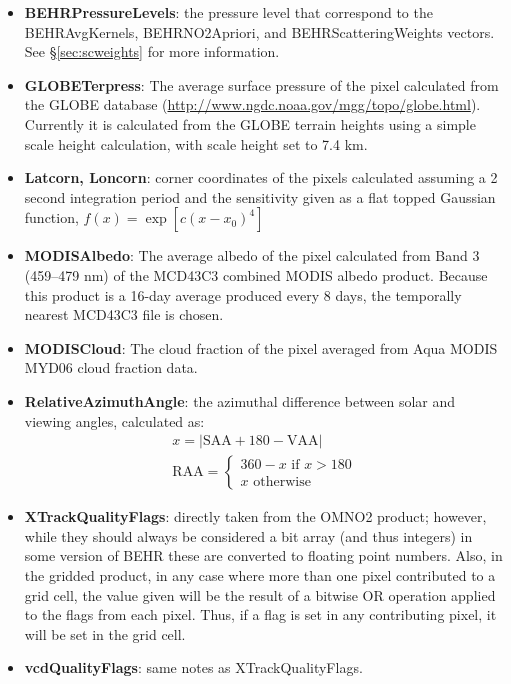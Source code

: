 \documentclass[12pt]{article}
\begin{document}
\begin{itemize}
	\item \textbf{BEHRPressureLevels}: the pressure level that correspond to the BEHRAvgKernels, BEHRNO2Apriori, and BEHRScatteringWeights vectors. See \S\ref{sec:scweights} for more information.
	
	\item \textbf{GLOBETerpress}: The average surface pressure of the pixel calculated from the GLOBE database (\url{http://www.ngdc.noaa.gov/mgg/topo/globe.html}). Currently it is calculated from the GLOBE terrain heights using a simple scale height calculation, with scale height set to 7.4 km.
	
	\item \textbf{Latcorn, Loncorn}: corner coordinates of the pixels calculated assuming a 2 second integration period and the sensitivity given as a flat topped Gaussian function, $f(x) = \exp[c(x - x_0)^4]$
	
	\item \textbf{MODISAlbedo}: The average albedo of the pixel calculated from Band 3 (459--479 nm) of the MCD43C3 combined MODIS albedo product. Because this product is a 16-day average produced every 8 days, the temporally nearest MCD43C3 file is chosen.
	
	\item \textbf{MODISCloud}: The cloud fraction of the pixel averaged from Aqua MODIS MYD06 cloud fraction data.
	
	\item \textbf{RelativeAzimuthAngle}: the azimuthal difference between solar and viewing angles, calculated as:
	\begin{align*}
		x = |\mathrm{SAA} + 180 - \mathrm{VAA}| \\
		\mathrm{RAA} = \left\{ 
				\begin{matrix}
					360 - x \text{ if } x > 180 \\
					x	\text{ otherwise}
				\end{matrix}
			\right.
	\end{align*}
	
	\item \textbf{XTrackQualityFlags}: directly taken from the OMNO2 product; however, while they should always be considered a bit array (and thus integers) in some version of BEHR these are converted to floating point numbers.  Also, in the gridded product, in any case where more than one pixel contributed to a grid cell, the value given will be the result of a bitwise OR operation applied to the flags from each pixel. Thus, if a flag is set in any contributing pixel, it will be set in the grid cell.
	
	\item \textbf{vcdQualityFlags}: same notes as XTrackQualityFlags.
	
	\end{itemize}
\end{document}
